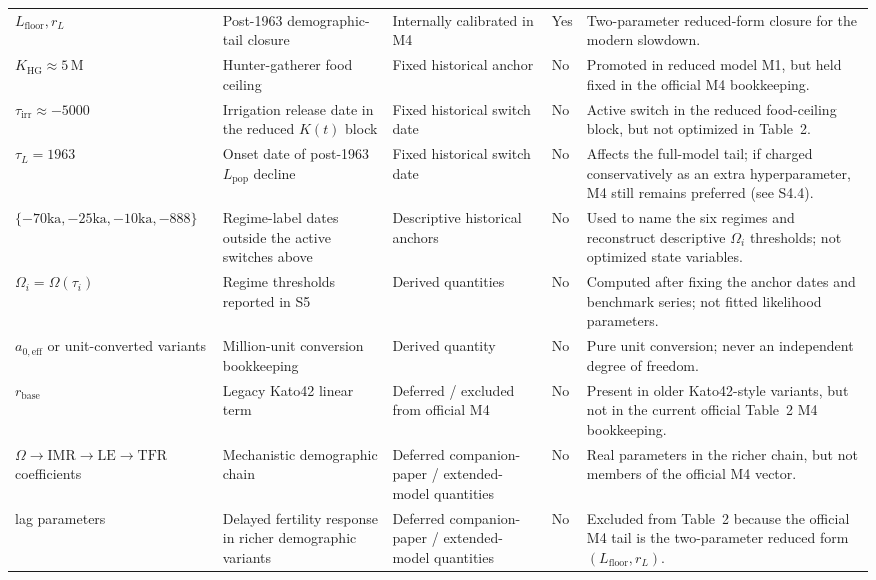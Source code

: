 \documentclass[11pt]{article}
\newcommand{\IMR}{\mathrm{IMR}}
\newcommand{\LE}{\mathrm{LE}}
\newcommand{\TFR}{\mathrm{TFR}}
\begin{document}
\begin{center}
\begin{longtable}{>{\raggedright\arraybackslash}p{2.1cm} >{\raggedright\arraybackslash}p{3.0cm} >{\raggedright\arraybackslash}p{3.4cm} >{\centering\arraybackslash}p{1.4cm} >{\raggedright\arraybackslash}p{4.1cm}}
$L_{\mathrm{floor}},r_L$ & Post-1963 demographic-tail closure & Internally calibrated in M4 & Yes & Two-parameter reduced-form closure for the modern slowdown.\\
$K_{\mathrm{HG}}\approx 5\,$M & Hunter-gatherer food ceiling & Fixed historical anchor & No & Promoted in reduced model M1, but held fixed in the official M4 bookkeeping.\\
$\tau_{\mathrm{irr}}\approx -5000$ & Irrigation release date in the reduced $K(t)$ block & Fixed historical switch date & No & Active switch in the reduced food-ceiling block, but not optimized in Table~2.\\
$\tau_{L}=1963$ & Onset date of post-1963 $L_{\mathrm{pop}}$ decline & Fixed historical switch date & No & Affects the full-model tail; if charged conservatively as an extra hyperparameter, M4 still remains preferred (see S4.4).\\
$\{-70\mathrm{ka},-25\mathrm{ka},-10\mathrm{ka},-888\}$ & Regime-label dates outside the active switches above & Descriptive historical anchors & No & Used to name the six regimes and reconstruct descriptive $\Omega_i$ thresholds; not optimized state variables.\\
$\Omega_i=\Omega(\tau_i)$ & Regime thresholds reported in S5 & Derived quantities & No & Computed after fixing the anchor dates and benchmark series; not fitted likelihood parameters.\\
$a_{0,\mathrm{eff}}$ or unit-converted variants & Million-unit conversion bookkeeping & Derived quantity & No & Pure unit conversion; never an independent degree of freedom.\\
$r_{\mathrm{base}}$ & Legacy Kato42 linear term & Deferred / excluded from official M4 & No & Present in older Kato42-style variants, but not in the current official Table~2 M4 bookkeeping.\\
$\Omega\!\to\!\IMR\!\to\!\LE\!\to\!\TFR$ coefficients & Mechanistic demographic chain & Deferred companion-paper / extended-model quantities & No & Real parameters in the richer chain, but not members of the official M4 vector.\\lag parameters & Delayed fertility response in richer demographic variants & Deferred companion-paper / extended-model quantities & No & Excluded from Table~2 because the official M4 tail is the two-parameter reduced form $(L_{\mathrm{floor}},r_L)$.\\\bottomrule
\end{longtable}\end{center}
\end{document}
